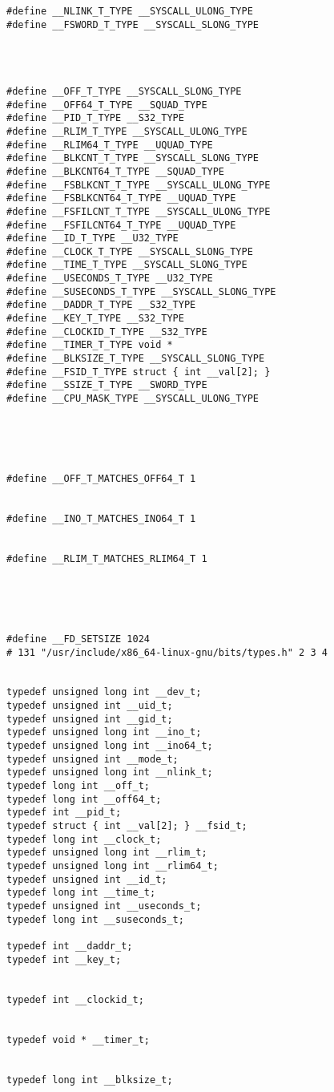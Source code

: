 \documentclass[11pt]{article}
\begin{document}
\begin{verbatim}
#define __NLINK_T_TYPE __SYSCALL_ULONG_TYPE
#define __FSWORD_T_TYPE __SYSCALL_SLONG_TYPE




#define __OFF_T_TYPE __SYSCALL_SLONG_TYPE
#define __OFF64_T_TYPE __SQUAD_TYPE
#define __PID_T_TYPE __S32_TYPE
#define __RLIM_T_TYPE __SYSCALL_ULONG_TYPE
#define __RLIM64_T_TYPE __UQUAD_TYPE
#define __BLKCNT_T_TYPE __SYSCALL_SLONG_TYPE
#define __BLKCNT64_T_TYPE __SQUAD_TYPE
#define __FSBLKCNT_T_TYPE __SYSCALL_ULONG_TYPE
#define __FSBLKCNT64_T_TYPE __UQUAD_TYPE
#define __FSFILCNT_T_TYPE __SYSCALL_ULONG_TYPE
#define __FSFILCNT64_T_TYPE __UQUAD_TYPE
#define __ID_T_TYPE __U32_TYPE
#define __CLOCK_T_TYPE __SYSCALL_SLONG_TYPE
#define __TIME_T_TYPE __SYSCALL_SLONG_TYPE
#define __USECONDS_T_TYPE __U32_TYPE
#define __SUSECONDS_T_TYPE __SYSCALL_SLONG_TYPE
#define __DADDR_T_TYPE __S32_TYPE
#define __KEY_T_TYPE __S32_TYPE
#define __CLOCKID_T_TYPE __S32_TYPE
#define __TIMER_T_TYPE void *
#define __BLKSIZE_T_TYPE __SYSCALL_SLONG_TYPE
#define __FSID_T_TYPE struct { int __val[2]; }
#define __SSIZE_T_TYPE __SWORD_TYPE
#define __CPU_MASK_TYPE __SYSCALL_ULONG_TYPE





#define __OFF_T_MATCHES_OFF64_T 1


#define __INO_T_MATCHES_INO64_T 1


#define __RLIM_T_MATCHES_RLIM64_T 1





#define __FD_SETSIZE 1024
# 131 "/usr/include/x86_64-linux-gnu/bits/types.h" 2 3 4


typedef unsigned long int __dev_t;
typedef unsigned int __uid_t;
typedef unsigned int __gid_t;
typedef unsigned long int __ino_t;
typedef unsigned long int __ino64_t;
typedef unsigned int __mode_t;
typedef unsigned long int __nlink_t;
typedef long int __off_t;
typedef long int __off64_t;
typedef int __pid_t;
typedef struct { int __val[2]; } __fsid_t;
typedef long int __clock_t;
typedef unsigned long int __rlim_t;
typedef unsigned long int __rlim64_t;
typedef unsigned int __id_t;
typedef long int __time_t;
typedef unsigned int __useconds_t;
typedef long int __suseconds_t;

typedef int __daddr_t;
typedef int __key_t;


typedef int __clockid_t;


typedef void * __timer_t;


typedef long int __blksize_t;





\end{verbatim}
\end{document}
